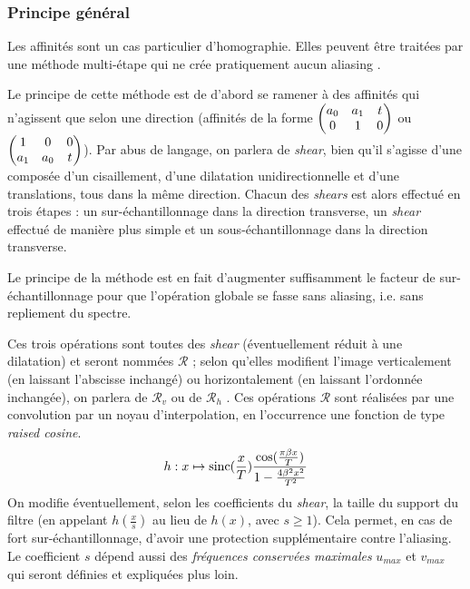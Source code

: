 \subsubsection{Principe général}
	
	Les affinités sont un cas particulier d'homographie. Elles peuvent être traitées par une méthode multi-étape qui ne crée pratiquement aucun aliasing \cite{szeliski2010high}.
	
	Le principe de cette méthode est de d'abord se ramener à des affinités qui n'agissent que selon une direction (affinités de la forme $\begin{pmatrix} a_0 & a_1 & t\\ 0 & 1 & 0 \end{pmatrix}$ ou $\begin{pmatrix} 1 & 0 & 0\\ a_1 & a_0 & t \end{pmatrix}$). Par abus de langage, on parlera de \emph{shear}, bien qu'il s'agisse d'une composée d'un cisaillement, d'une dilatation unidirectionnelle et d'une translations, tous dans la même direction. Chacun des \emph{shears} est alors effectué en trois étapes : un sur-échantillonnage dans la direction transverse, un \emph{shear} effectué de manière plus simple et un sous-échantillonnage dans la direction transverse.
	
	Le principe de la méthode est en fait d'augmenter suffisamment le facteur de sur-échantillonnage pour que l'opération globale se fasse sans aliasing, i.e. sans repliement du spectre.
	
	Ces trois opérations sont toutes des \emph{shear} (éventuellement réduit à une dilatation) et seront nommées $\mathcal R$ ; selon qu'elles modifient l'image verticalement (en laissant l'abscisse inchangé) ou horizontalement (en laissant l'ordonnée inchangée), on parlera de $\mathcal R_v$ ou de $\mathcal R_h$ . Ces opérations $\mathcal R$ sont réalisées par une convolution par un noyau d'interpolation, en l'occurrence une fonction de type \emph{raised cosine}.
	\[h : x \mapsto \operatorname{sinc}(\frac{x}{T})\frac{\cos(\frac{\pi\beta x}{T})}{1-\frac{4\beta^2x^2}{T^2}}\]
	On modifie éventuellement, selon les coefficients du \emph{shear}, la taille du support du filtre (en appelant $h(\frac{x}{s})$ au lieu de $h(x)$, avec $s\geq 1$). Cela permet, en cas de fort sur-échantillonnage, d'avoir une protection supplémentaire contre l'aliasing. Le coefficient $s$ dépend aussi des \emph{fréquences conservées maximales} $u_{max}$ et $v_{max}$ qui seront définies et expliquées plus loin.
	
